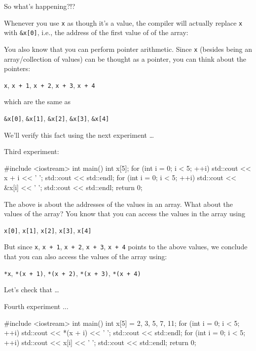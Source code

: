 So what's happening?!?

Whenever you use \texttt{x} as though it's a value, the compiler will actually replace \texttt{x} with \texttt{\&x[0]}, i.e., the address of the first value of of the array:
\begin{center}
\texttt{}\texttt{}
\end{center}
You also know that you can perform pointer arithmetic. Since \texttt{x} (besides being an array/collection of values) can be thought as a pointer, you can think about the pointers:
\begin{center}
\texttt{x}, \texttt{x + 1}, \texttt{x + 2}, \texttt{x + 3}, \texttt{x + 4}
\end{center}
which are the same as
\begin{center}
\texttt{\&x[0]}, \texttt{\&x[1]}, \texttt{\&x[2]}, \texttt{\&x[3]}, \texttt{\&x[4]}
\end{center}
We'll verify this fact using the next experiment \ldots{}

Third experiment:

\begin{consolethree}[escapeinside=||]
#include <iostream>
int main()
{
    int x[5];
    for (int i = 0; i < 5; ++i)
    {
        std::cout << x + i << ' ';
    }
    std::cout << std::endl;
    for (int i = 0; i < 5; ++i)
    {
        std::cout << &x[i] << ' ';
    }
    std::cout << std::endl;
    return 0;
}
\end{consolethree}

The above is about the addresses of the values in an array. What about
the values of the array? You know that you can access the values in the
array using
\begin{center}
\texttt{x[0]}, \texttt{x[1]}, \texttt{x[2]}, \texttt{x[3]}, \texttt{x[4]}
\end{center}
But since \texttt{x}, \texttt{x + 1}, \texttt{x + 2}, \texttt{x + 3}, \texttt{x + 4} points to the above values, we conclude that you can also access the values of the array using:

\begin{center}
\texttt{*x}, \texttt{*(x + 1)}, \texttt{*(x + 2)}, \texttt{*(x + 3)}, \texttt{*(x + 4)}
\end{center}

Let's check that \ldots{}

Fourth experiment ...

\begin{consolethree}[escapeinside=||]
#include <iostream>
int main()
{
    int x[5] = {2, 3, 5, 7, 11};
    for (int i = 0; i < 5; ++i)
    {
        std::cout << *(x + i) << ' ';
    }
    std::cout << std::endl;
    for (int i = 0; i < 5; ++i)
    {
        std::cout << x[i] << ' ';
    }
    std::cout << std::endl;
    return 0;
}
\end{consolethree}


